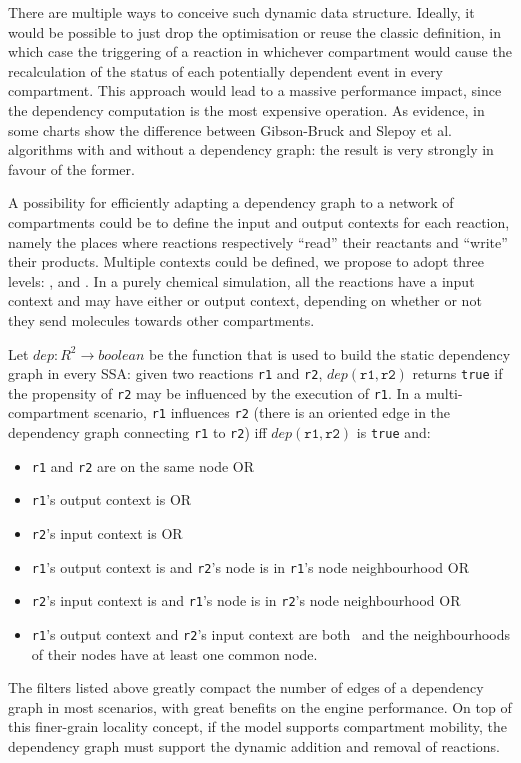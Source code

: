 \documentclass[12pt,a4paper,twoside,openright]{book}
\begin{document}
There are multiple ways to conceive such dynamic data structure.
%
Ideally, it would be possible to just drop the optimisation or reuse the classic definition, in which case the triggering of a reaction in whichever compartment would cause the recalculation of the status of each potentially dependent event in every compartment.
%
This approach would lead to a massive performance impact, since the dependency computation is the most expensive operation.
%
As evidence, in \cite{slepoy2008} some charts show the difference between Gibson-Bruck and Slepoy et al. algorithms with and without a dependency graph: the result is very strongly in favour of the former.

A possibility for efficiently adapting a dependency graph to a network of compartments could be to define the input and output contexts for each reaction, namely the places where reactions respectively ``read'' their reactants and ``write'' their products.
%
Multiple contexts could be defined, we propose to adopt three levels: \localc{}, \neighborhood{} and \globalc{}.
%
In a purely chemical simulation, all the reactions have a \localc{} input context and may have either \neighborhood{} or \localc{} output context, depending on whether or not they send molecules towards other compartments.

Let $dep: R^2 \longrightarrow boolean$ be the function that is used to build the static dependency graph in every SSA: given two reactions \texttt{r1} and \texttt{r2}, $dep(\texttt{r1}, \texttt{r2})$ returns \texttt{true} if the propensity of \texttt{r2} may be influenced by the execution of \texttt{r1}.
%
In a multi-compartment scenario, \texttt{r1} influences \texttt{r2} (there is an oriented edge in the dependency graph connecting \texttt{r1} to \texttt{r2}) iff $dep(\texttt{r1},\texttt{r2})$ is \texttt{true} and:
\begin{itemize}
 \item \texttt{r1} and \texttt{r2} are on the same node OR
 \item \texttt{r1}'s output context is \globalc{} OR
 \item \texttt{r2}'s input context is \globalc{} OR
 \item \texttt{r1}'s output context is \neighborhood{} and \texttt{r2}'s node is in \texttt{r1}'s node neighbourhood OR
 \item \texttt{r2}'s input context is \neighborhood{} and \texttt{r1}'s node is in \texttt{r2}'s node neighbourhood OR
 \item \texttt{r1}'s output context and \texttt{r2}'s input context are both \neighborhood\ and the neighbourhoods of their nodes have at least one common node. 
\end{itemize}
%
The filters listed above greatly compact the number of edges of a dependency graph in most scenarios, with great benefits on the engine performance.
%
On top of this finer-grain locality concept, if the model supports compartment mobility, the dependency graph must support the dynamic addition and removal of reactions.
\end{document}
